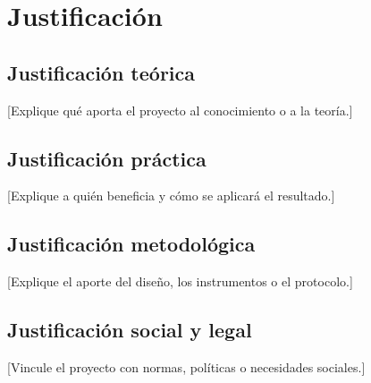 \section{Justificación}

\subsection{Justificación teórica}
[Explique qué aporta el proyecto al conocimiento o a la teoría.]

\subsection{Justificación práctica}
[Explique a quién beneficia y cómo se aplicará el resultado.]

\subsection{Justificación metodológica}
[Explique el aporte del diseño, los instrumentos o el protocolo.]

\subsection{Justificación social y legal}
[Vincule el proyecto con normas, políticas o necesidades sociales.]

